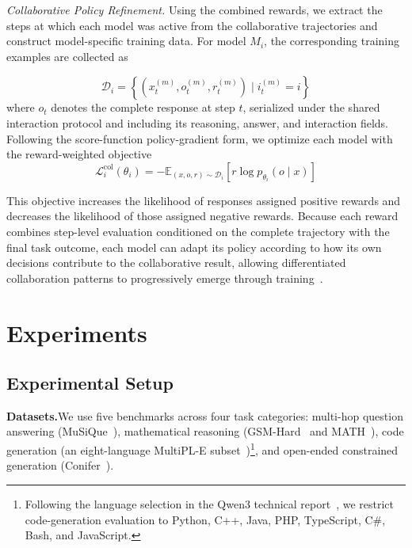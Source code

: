 \documentclass{article} %
\begin{document}
\noindent\textit{Collaborative Policy Refinement.}\quad
Using the combined rewards, we extract the steps at which each model was active from the collaborative trajectories and construct model-specific training data. For model $M_i$, the corresponding training examples are collected as

\begin{equation}
\mathcal{D}_i
=
\left\{
(x_t^{(m)},o_t^{(m)},r_t^{(m)})
\mid
i_t^{(m)}=i
\right\}  
\end{equation}
where $o_t$ denotes the complete response at step $t$, serialized under the shared interaction protocol and including its reasoning, answer, and interaction fields. Following the score-function policy-gradient form, we optimize each model with the reward-weighted objective
\begin{equation}
    \mathcal{L}_i^{\mathrm{col}}(\theta_i)
    =
    -\mathbb{E}_{(x,o,r)\sim\mathcal{D}_i}
    \left[
        r\log p_{\theta_i}(o\mid x)
    \right]
    \label{eq:collaborative_objective}
\end{equation}

This objective increases the likelihood of responses assigned positive rewards and decreases the likelihood of those assigned negative rewards. Because each reward combines step-level evaluation conditioned on the complete trajectory with the final task outcome, each model can adapt its policy according to how its own decisions contribute to the collaborative result, allowing differentiated collaboration patterns to progressively emerge through training~\citep{cui2026prime}.


\section{Experiments}
\label{sec:experiments}

\subsection{Experimental Setup}
\label{sec:experimental_setup}

\noindent\textbf{Datasets.}\quad We use five benchmarks across four task categories: multi-hop question answering (MuSiQue~\citep{trivedi2022musique}), mathematical reasoning (GSM-Hard~\citep{gao2023pal} and MATH~\citep{hendrycks2021math}), code generation (an eight-language MultiPL-E subset~\citep{cassano2023multiple})\footnote{Following the language selection in the Qwen3 technical report~\citep{yang2025qwen3}, we restrict code-generation evaluation to Python, C++, Java, PHP, TypeScript, C\#, Bash, and JavaScript.}, and open-ended constrained generation (Conifer~\citep{sun2024conifer}).
\end{document}

